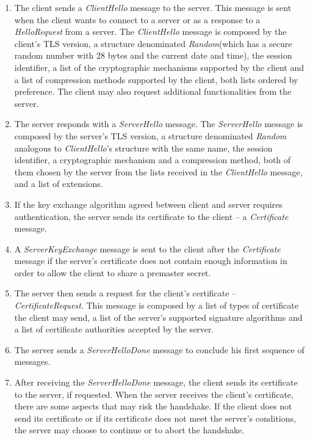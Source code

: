 \documentclass{sig-alternate-05-2015}
\begin{document}
\begin{enumerate}

\item {The client sends a \textit{ClientHello} message to the server. This message is sent when the client wants to connect to a server or as a response to a \textit{HelloRequest} from a server. The \textit{ClientHello} message is composed by the client's TLS version, a structure denominated \textit{Random}(which has a secure random number with 28 bytes and the current date and time), the session identifier, a list of the cryptographic mechanisms supported by the client and a list of compression methods supported by the client, both lists ordered by preference. The client may also request additional functionalities from the server.}

\item {The server responds with a \textit{ServerHello} message. The \textit{ServerHello} message is composed by the server's TLS version, a structure denominated \textit{Random} analogous to \textit{ClientHello}'s structure with the same name, the session identifier, a cryptographic mechanism and a compression method, both of them chosen by the server from the lists received in the \textit{ClientHello} message, and a list of extensions.}

\item {If the key exchange algorithm agreed between client and server requires authentication, the server sends its certificate to the client -- a \textit{Certificate} message.}

\item {A \textit{ServerKeyExchange} message is sent to the client after the \textit{Certificate} message if the server's certificate does not contain enough information in order to allow the client to share a premaster secret.}

\item {The server then sends a request for the client's certificate -- \textit{CertificateRequest}. This message is composed by a list of types of certificate the client may send, a list of the server's supported signature algorithms and a list of certificate authorities accepted by the server.}

\item {The server sends a \textit{ServerHelloDone} message to conclude his first sequence of messages.}

\item {After receiving the \textit{ServerHelloDone} message, the client sends its certificate to the server, if requested. When the server receives the client's certificate, there are some aspects that may risk the handshake. If the client does not send its certificate or if its certificate does not meet the server's conditions, the server may choose to continue or to abort the handshake.}


\end{enumerate}
\end{document}
